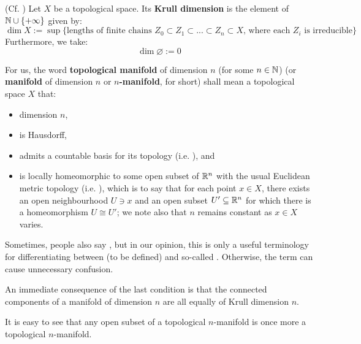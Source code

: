         \begin{definition} \label{def: krull_dimension}
            (Cf. \cite[\href{https://stacks.math.columbia.edu/tag/0055}{Tag 0055}]{stacks}) Let $X$ be a topological space. Its \textbf{Krull dimension} is the element of $\mathbb{N} \cup \{+\infty\}$ given by:
                $$\dim X := \sup \{ \text{lengths of finite chains $Z_0 \subset Z_1 \subset ... \subset Z_n \subset X$, where each $Z_i$ is irreducible} \}$$
            Furthermore, we take:
                $$\dim \varnothing := 0$$
        \end{definition}
        \begin{definition} \label{def: topological_manifolds}
            For us, the word \textbf{topological manifold} of dimension $n$ (for some $n \in \mathbb{N}$) (or \textbf{manifold} of dimension $n$ or \textbf{$n$-manifold}, for short) shall mean a topological space $X$ that:
            \begin{itemize}
                \item dimension $n$,
                \item is Hausdorff,
                \item admits a countable basis for its topology (i.e. ), and
                \item is locally homeomorphic to some open subset of $\mathbb{R}^n$ with the usual Euclidean metric topology (i.e. ), which is to say that for each point $x \in X$, there exists an open neighbourhood $U \ni x$ and an open subset $U' \subseteq \mathbb{R}^n$ for which there is a homeomorphism $U \cong U'$; we note also that $n$ remains constant as $x \in X$ varies.
            \end{itemize}
            
            Sometimes, people also say , but in our opinion, this is only a useful terminology for differentiating between  (to be defined) and so-called . Otherwise, the term can cause unnecessary confusion.
        \end{definition}
        \begin{remark}
            An immediate consequence of the last condition is that the connected components of a manifold of dimension $n$ are all equally of Krull dimension $n$.
        \end{remark}
        \begin{remark} \label{remark: open_subsets_of_topological_manifolds}
            It is easy to see that any open subset of a topological $n$-manifold is once more a topological $n$-manifold.
        \end{remark}
